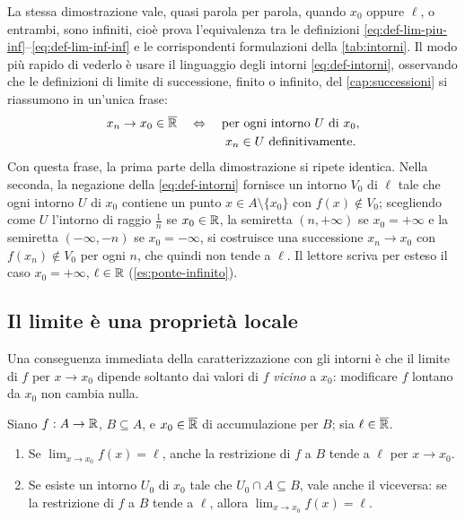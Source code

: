 \begin{osservazione}\label{oss:ponte-infinito}
La stessa dimostrazione vale, quasi parola per parola, quando $x_{0}$ oppure $\ell$, o
entrambi, sono infiniti, cioè prova l'equivalenza tra le definizioni
\eqref{eq:def-lim-piu-inf}--\eqref{eq:def-lim-inf-inf} e le corrispondenti formulazioni
della \cref{tab:intorni}. Il modo più rapido di vederlo è usare il linguaggio degli
intorni \eqref{eq:def-intorni}, osservando che le definizioni di limite di successione,
finito o infinito, del \cref{cap:successioni} si riassumono in un'unica frase:
\[
  x_{n}\to x_{0}\in\overline{\mathbb{R}} \quad\Leftrightarrow\quad
  \begin{gathered}[t]
    \text{per ogni intorno } U \text{ di } x_{0},\\
    x_{n}\in U \text{ definitivamente.}
  \end{gathered}
\]
Con questa frase, la prima parte della dimostrazione si ripete identica. Nella seconda,
la negazione della \eqref{eq:def-intorni} fornisce un intorno $V_{0}$ di $\ell$ tale che
ogni intorno $U$ di $x_{0}$ contiene un punto $x\in A\setminus\{x_{0}\}$ con
$f(x)\notin V_{0}$; scegliendo come $U$ l'intorno di raggio $\frac1n$ se $x_{0}\in\mathbb{R}$,
la semiretta $(n,+\infty)$ se $x_{0}=+\infty$ e la semiretta $(-\infty,-n)$ se
$x_{0}=-\infty$, si costruisce una successione $x_{n}\to x_{0}$ con $f(x_{n})\notin V_{0}$
per ogni $n$, che quindi non tende a $\ell$. Il lettore scriva per esteso il caso
$x_{0}=+\infty$, $\ell\in\mathbb{R}$ (\cref{es:ponte-infinito}).
\end{osservazione}

\subsection{Il limite è una proprietà locale}

Una conseguenza immediata della caratterizzazione con gli intorni è che il limite di $f$
per $x\to x_{0}$ dipende soltanto dai valori di $f$ \emph{vicino} a $x_{0}$: modificare
$f$ lontano da $x_{0}$ non cambia nulla.

\begin{lemma}\label{lem:localita}
Siano $f:A\to\mathbb{R}$, $B\subseteq A$, e $x_{0}\in\overline{\mathbb{R}}$ di accumulazione per $B$; sia
$\ell\in\overline{\mathbb{R}}$.
\begin{enumerate}[label=\textup{(\roman*)}]
  \item Se $\lim_{x\to x_{0}}f(x)=\ell$, anche la restrizione di $f$ a $B$ tende a $\ell$
  per $x\to x_{0}$.
  \item Se esiste un intorno $U_{0}$ di $x_{0}$ tale che $U_{0}\cap A\subseteq B$, vale anche il
  viceversa: se la restrizione di $f$ a $B$ tende a $\ell$, allora
  $\lim_{x\to x_{0}}f(x)=\ell$.
\end{enumerate}
\end{lemma}


